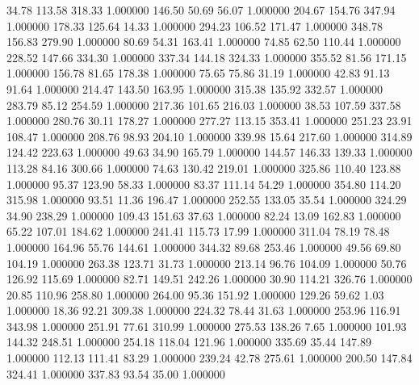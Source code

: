      34.78    113.58    318.33  1.000000
    146.50     50.69     56.07  1.000000
    204.67    154.76    347.94  1.000000
    178.33    125.64     14.33  1.000000
    294.23    106.52    171.47  1.000000
    348.78    156.83    279.90  1.000000
     80.69     54.31    163.41  1.000000
     74.85     62.50    110.44  1.000000
    228.52    147.66    334.30  1.000000
    337.34    144.18    324.33  1.000000
    355.52     81.56    171.15  1.000000
    156.78     81.65    178.38  1.000000
     75.65     75.86     31.19  1.000000
     42.83     91.13     91.64  1.000000
    214.47    143.50    163.95  1.000000
    315.38    135.92    332.57  1.000000
    283.79     85.12    254.59  1.000000
    217.36    101.65    216.03  1.000000
     38.53    107.59    337.58  1.000000
    280.76     30.11    178.27  1.000000
    277.27    113.15    353.41  1.000000
    251.23     23.91    108.47  1.000000
    208.76     98.93    204.10  1.000000
    339.98     15.64    217.60  1.000000
    314.89    124.42    223.63  1.000000
     49.63     34.90    165.79  1.000000
    144.57    146.33    139.33  1.000000
    113.28     84.16    300.66  1.000000
     74.63    130.42    219.01  1.000000
    325.86    110.40    123.88  1.000000
     95.37    123.90     58.33  1.000000
     83.37    111.14     54.29  1.000000
    354.80    114.20    315.98  1.000000
     93.51     11.36    196.47  1.000000
    252.55    133.05     35.54  1.000000
    324.29     34.90    238.29  1.000000
    109.43    151.63     37.63  1.000000
     82.24     13.09    162.83  1.000000
     65.22    107.01    184.62  1.000000
    241.41    115.73     17.99  1.000000
    311.04     78.19     78.48  1.000000
    164.96     55.76    144.61  1.000000
    344.32     89.68    253.46  1.000000
     49.56     69.80    104.19  1.000000
    263.38    123.71     31.73  1.000000
    213.14     96.76    104.09  1.000000
     50.76    126.92    115.69  1.000000
     82.71    149.51    242.26  1.000000
     30.90    114.21    326.76  1.000000
     20.85    110.96    258.80  1.000000
    264.00     95.36    151.92  1.000000
    129.26     59.62      1.03  1.000000
     18.36     92.21    309.38  1.000000
    224.32     78.44     31.63  1.000000
    253.96    116.91    343.98  1.000000
    251.91     77.61    310.99  1.000000
    275.53    138.26      7.65  1.000000
    101.93    144.32    248.51  1.000000
    254.18    118.04    121.96  1.000000
    335.69     35.44    147.89  1.000000
    112.13    111.41     83.29  1.000000
    239.24     42.78    275.61  1.000000
    200.50    147.84    324.41  1.000000
    337.83     93.54     35.00  1.000000
